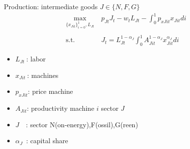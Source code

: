 \documentclass[11pt,aspectratio=169]{beamer}
\begin{document}
\begin{frame}{Production: intermediate goods $J\in \{N,F,G\}$ }
\vspace{0mm}
\begin{align*}
	\underset{\{x_{Jit}\}_{i=0}^1, L_{Jt}}{\max}\ & p_{Jt}J_t-w_{t}L_{Jt}-\int_{0}^{1}p_{xJit}x_{Jit}di \\ \ \\
	\text{s.t.}\ & J_{t}=L_{Jt}^{1-\alpha_J}\int_{0}^{1}A^{1-\alpha_J}_{Jit}x_{Jit}^{\alpha_J}di
\end{align*}

\small
\vspace{10mm}
\hspace{-4mm}
\begin{minipage}[t!]{0.3\textwidth}
	\vspace{0mm}
	\begin{itemize}	
		\item[]$L_{Jt}\ $: labor 
		\vspace{-2mm}	
		\item[]$x_{Jit}\ $: machines 
		\vspace{-2mm}	
		\item[]$p_{xJit}$: price machine 
	\end{itemize}
\end{minipage}
\begin{minipage}[t!]{0.5\textwidth}
	\vspace{0mm}
	\begin{itemize}
		\item[] $A_{Jit}$: productivity machine $i$ sector $J$ \vspace{-2mm}
		\item[] $J$\ \  : sector N(on-energy),F(ossil),G(reen)
		\vspace{-2mm}	
		\item[] $\alpha_J$\ : capital share 
	\end{itemize}
\end{minipage}
\end{frame}
\end{document}
